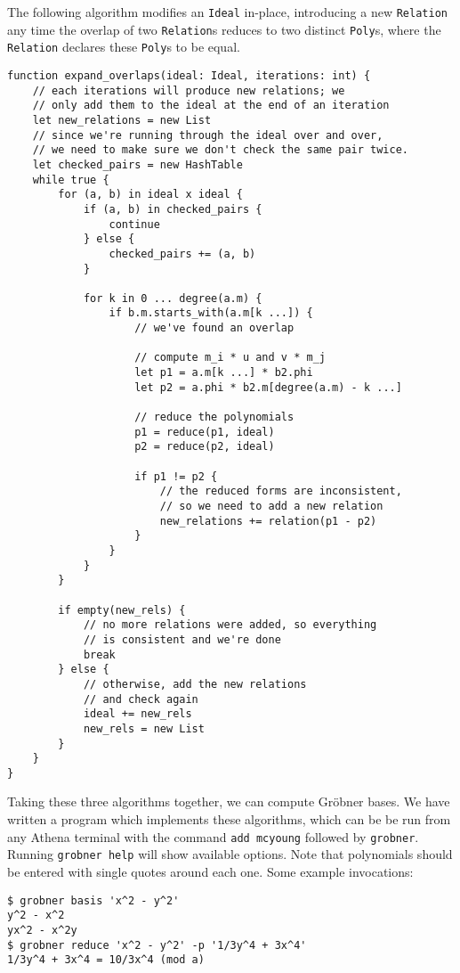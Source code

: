 \begin{alg}
    The following algorithm modifies an \verb|Ideal| in-place, introducing a new
    \verb|Relation| any time the overlap of two \verb|Relation|s reduces to two
    distinct \verb|Poly|s, where the \verb|Relation| declares these \verb|Poly|s to
    be equal.
\begin{verbatim}
function expand_overlaps(ideal: Ideal, iterations: int) {
    // each iterations will produce new relations; we 
    // only add them to the ideal at the end of an iteration
    let new_relations = new List
    // since we're running through the ideal over and over,
    // we need to make sure we don't check the same pair twice.
    let checked_pairs = new HashTable
    while true {
        for (a, b) in ideal x ideal {
            if (a, b) in checked_pairs {
                continue
            } else {
                checked_pairs += (a, b)
            }
            
            for k in 0 ... degree(a.m) {
                if b.m.starts_with(a.m[k ...]) {
                    // we've found an overlap
                    
                    // compute m_i * u and v * m_j
                    let p1 = a.m[k ...] * b2.phi
                    let p2 = a.phi * b2.m[degree(a.m) - k ...]
                    
                    // reduce the polynomials
                    p1 = reduce(p1, ideal)
                    p2 = reduce(p2, ideal)
                    
                    if p1 != p2 {
                        // the reduced forms are inconsistent, 
                        // so we need to add a new relation
                        new_relations += relation(p1 - p2)
                    }
                }
            }
        }
        
        if empty(new_rels) {
            // no more relations were added, so everything
            // is consistent and we're done
            break
        } else {
            // otherwise, add the new relations
            // and check again
            ideal += new_rels
            new_rels = new List
        }
    }
}
\end{verbatim}
\end{alg}

Taking these three algorithms together, we can compute Gr\"obner bases. We have written
a program which implements these algorithms, which can be be run from any Athena
terminal with the command \verb|add mcyoung| followed by \verb|grobner|. Running
\verb|grobner help| will show available options. Note that polynomials
should be entered with single quotes around each one. Some example invocations:
\begin{verbatim}
$ grobner basis 'x^2 - y^2'
y^2 - x^2
yx^2 - x^2y
$ grobner reduce 'x^2 - y^2' -p '1/3y^4 + 3x^4'
1/3y^4 + 3x^4 = 10/3x^4 (mod a)
\end{verbatim}

